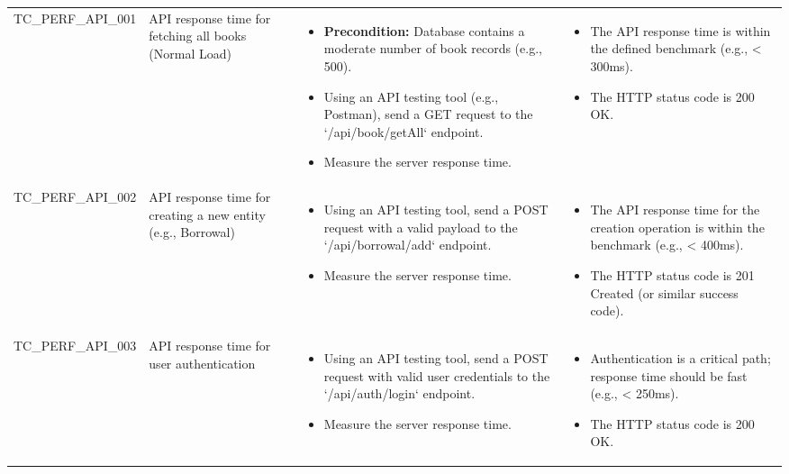 \begin{longtable}{|>{\scriptsize\raggedright\arraybackslash}p{3.5cm}|>{\raggedright\arraybackslash}p{3cm}|>{\raggedright\arraybackslash}p{4cm}|>{\raggedright\arraybackslash}p{4.5cm}|}
\multicolumn{4}{|l|}{\textbf{Sub-Section: API Response Time Testing}} \\ \hline
TC\_PERF\_API\_001 & API response time for fetching all books (Normal Load) & 
    \begin{itemize}[noitemsep, topsep=0pt, partopsep=0pt, leftmargin=*]
        \item \textbf{Precondition:} Database contains a moderate number of book records (e.g., 500).
        \item Using an API testing tool (e.g., Postman), send a GET request to the `/api/book/getAll` endpoint.
        \item Measure the server response time.
    \end{itemize} & 
    \begin{itemize}[noitemsep, topsep=0pt, partopsep=0pt, leftmargin=*]
        \item The API response time is within the defined benchmark (e.g., < 300ms).
        \item The HTTP status code is 200 OK.
    \end{itemize} \\ \hline
TC\_PERF\_API\_002 & API response time for creating a new entity (e.g., Borrowal) & 
    \begin{itemize}[noitemsep, topsep=0pt, partopsep=0pt, leftmargin=*]
        \item Using an API testing tool, send a POST request with a valid payload to the `/api/borrowal/add` endpoint.
        \item Measure the server response time.
    \end{itemize} & 
    \begin{itemize}[noitemsep, topsep=0pt, partopsep=0pt, leftmargin=*]
        \item The API response time for the creation operation is within the benchmark (e.g., < 400ms).
        \item The HTTP status code is 201 Created (or similar success code).
    \end{itemize} \\ \hline
TC\_PERF\_API\_003 & API response time for user authentication & 
    \begin{itemize}[noitemsep, topsep=0pt, partopsep=0pt, leftmargin=*]
        \item Using an API testing tool, send a POST request with valid user credentials to the `/api/auth/login` endpoint.
        \item Measure the server response time.
    \end{itemize} & 
    \begin{itemize}[noitemsep, topsep=0pt, partopsep=0pt, leftmargin=*]
        \item Authentication is a critical path; response time should be fast (e.g., < 250ms).
        \item The HTTP status code is 200 OK.
    \end{itemize} \\ \hline


\end{longtable}
